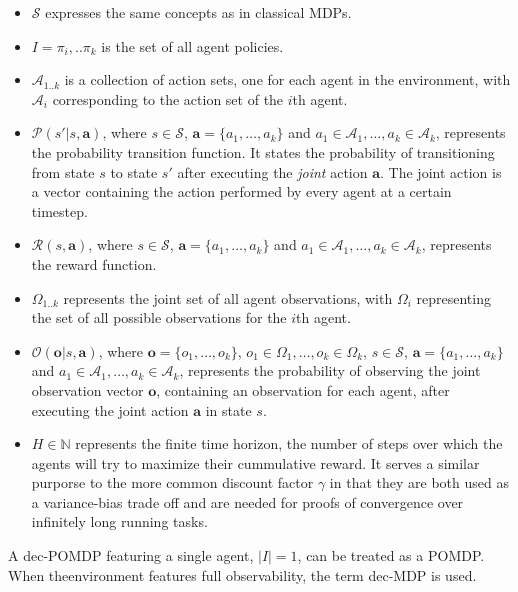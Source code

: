 \documentclass{../main.tex}{}
\begin{document}
    \begin{itemize}
        \item $\mathcal{S}$ expresses the same concepts as in classical MDPs.
        \item $I = {\pi_i,..\pi_k}$ is the set of all agent policies.
        \item $\mathcal{A}_{1..k}$ is a collection of action sets, one for each agent in the environment, with $\mathcal{A}_i$ corresponding to the action set of the $i$th agent.
        \item $\mathcal{P}(s' | s, \mathbf{a})$, where $s \in \mathcal{S}$, $\mathbf{a} = \{a_1,\ldots,a_k\}$ and $a_1 \in \mathcal{A}_1, \ldots, a_k \in \mathcal{A}_k$, represents the probability transition function. It states the probability of transitioning from state $s$ to state $s'$ after executing the \textit{joint} action $\mathbf{a}$. The joint action is a vector containing the action performed by every agent at a certain timestep.
        \item $\mathcal{R}(s, \mathbf{a})$, where $s \in \mathcal{S}$, $\mathbf{a} = \{a_1,\ldots,a_k\}$ and $a_1 \in \mathcal{A}_1, \ldots, a_k \in \mathcal{A}_k$, represents the reward function.
        \item $\Omega_{1..k}$ represents the joint set of all agent observations, with $\Omega_i$ representing the set of all possible observations for the $i$th agent.
        \item $\mathcal{O}(\mathbf{o} | s, \mathbf{a})$, where $\mathbf{o} = \{o_1,\ldots,o_k\}$, $o_1 \in \Omega_1, \ldots, o_k \in \Omega_k$, $s \in \mathcal{S}$, $\mathbf{a} = \{a_1,\ldots,a_k\}$ and $a_1 \in \mathcal{A}_1, \ldots, a_k \in \mathcal{A}_k$, represents the probability of observing the joint observation vector $\mathbf{o}$, containing an observation for each agent, after executing the joint action $\mathbf{a}$ in state $s$.
        \item $H \in \mathbb{N}$ represents the finite time horizon, the number of steps over which the agents will try to maximize their cummulative reward. It serves a similar purporse to the more common discount factor $\gamma$ in that they are both used as a variance-bias trade off and are needed for proofs of convergence over infinitely long running tasks.
    \end{itemize}

    A dec-POMDP featuring a single agent, $|I| = 1$, can be treated as a POMDP. When theenvironment features full observability, the term dec-MDP is used.
\end{document}
